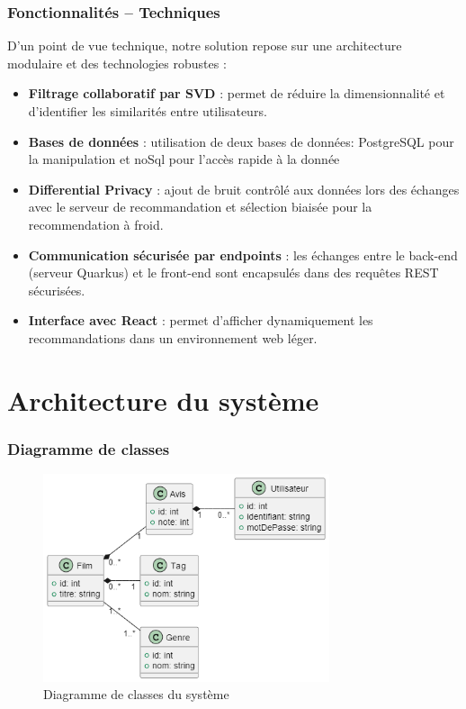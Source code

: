 \documentclass{beamer}
\begin{document}
\begin{frame}
    \frametitle{Fonctionnalités – Techniques}
    \small
    D’un point de vue technique, notre solution repose sur une architecture modulaire et des technologies robustes :

    \begin{itemize}
        \item \textbf{Filtrage collaboratif par SVD} : permet de réduire la dimensionnalité et d’identifier les similarités entre utilisateurs.
        \item \textbf{Bases de données} : utilisation de deux bases de données: PostgreSQL pour la manipulation et noSql pour l'accès rapide à la donnée
        \item \textbf{Differential Privacy} : ajout de bruit contrôlé aux données lors des échanges avec le serveur de recommandation et sélection biaisée pour la recommendation à froid.
        \item \textbf{Communication sécurisée par endpoints} : les échanges entre le back-end (serveur Quarkus) et le front-end sont encapsulés dans des requêtes REST sécurisées.
        \item \textbf{Interface avec React} : permet d’afficher dynamiquement les recommandations dans un environnement web léger.
    \end{itemize}

\end{frame}



\section{Architecture du système}
\begin{frame}
    \frametitle{Diagramme de classes}
    \vspace{0.5cm}
    \begin{figure}
        \centering
        \includegraphics[width=0.75\textwidth]{classe.png}
        \caption{\small Diagramme de classes du système}
    \end{figure}
\end{frame}
\end{document}
